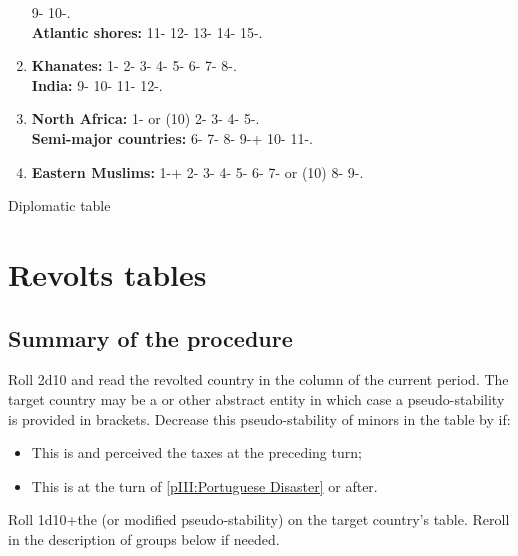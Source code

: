 \begin{tablehere}
\begin{enumerate}
    9- %
    10-.\\ %
    {\bf Atlantic shores:} %
    11- %
    12- %
    13- %
    14- %
    15-. %
  \item {\bf Khanates:} %
    1- %
    2- %
    3- %
    4- %
    5- %
    6- %
    7- %
    8-.\\ %
    {\bf India:} %
    9- %
    10- %
    11- %
    12-. %
  \item {\bf North Africa:} %
    1- or (10) %
    2- %
    3- %
    4-%
    5-.\\ %
    {\bf Semi-major countries:} %
    6- %
    7- %
    8- %
    9-+ %
    10- %
    11-. %
  \item {\bf Eastern Muslims:} %
    1-+ %
    2- %
    3- %
    4- %
    5- %
    6- %
    7- or (10) %
    8- %
    9-. %
  \end{enumerate}
  \caption{Diplomatic table}\label{table:diplomatic event}
\end{tablehere}

\clearpage

\section{Revolts tables}
\subsection{Summary of the procedure}

\aparag Roll 2d10 and read the revolted country in the column of the current
period. The target country may be a \MIN or other abstract entity in which
case a pseudo-stability is provided in brackets.
\bparag Decrease this pseudo-stability of minors in the table by 
if:
\begin{itemize}
\item This is \HOLhol and \SPA perceived the taxes at the preceding turn;
\item This is \PORpor at the turn of \ref{pIII:Portuguese Disaster} or after.
\end{itemize}
\aparag Roll 1d10+the \STAB (or modified pseudo-stability) on the target
country's table. Reroll in the description of groups below if needed.

